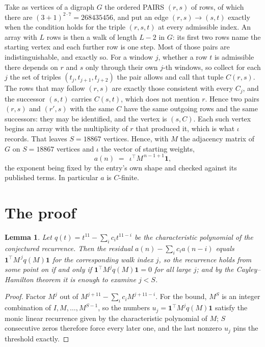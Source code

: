 \documentclass[11pt,a4paper]{article}
\theoremstyle{plain}
\newtheorem{lemma}[theorem]{Lemma}
\theoremstyle{definition}
\begin{document}
Take as vertices of a digraph $G$ the ordered PAIRS $(r,s)$ of rows, of which there are
$(3+1)^{2\cdot7}=268435456$, and put an edge $(r,s)\to(s,t)$ exactly when the condition
holds for the triple $(r,s,t)$ at every admissible index. An array with $L$ rows is then a
walk of length $L-2$ in $G$: its first two rows name the starting vertex and each further
row is one step. Most of those pairs are indistinguishable, and exactly so. For a window $j$, whether a row $t$ is admissible there depends on $r$ and $s$ only through their own $j$-th windows, so collect for each $j$ the set of triples $(t_j,t_{j+1},t_{j+2})$ the pair allows and call that tuple $C(r,s)$. The rows that may follow $(r,s)$ are exactly those consistent with every $C_j$, and the successor $(s,t)$ carries $C(s,t)$, which does not mention $r$. Hence two pairs $(r,s)$ and $(r',s)$ with the same $C$ have the same outgoing rows and the same successors: they may be identified, and the vertex is $(s,C)$. Each such vertex begins an array with the multiplicity of $r$ that produced it, which is what $\iota$ records. That leaves $S=18867$ vertices. Hence, with $M$ the adjacency matrix of $G$ on $S=18867$ vertices and
$\iota$ the vector of starting weights,
\[
a(n)\;=\;\,\iota^{\!\top}M^{\,n-1+1}\mathbf{1},
\]
the exponent being fixed by the entry's own shape and checked against its published terms.
In particular $a$ is $C$-finite.

\section{The proof}

\begin{lemma}\label{lem:crit}
Let $q(t)=t^{11}-\sum_i c_it^{11-i}$ be the characteristic polynomial of the
conjectured recurrence. Then the residual $a(n)-\sum_ic_ia(n-i)$ equals
$\mathbf{1}^{\!\top}M^{\,j}q(M)\mathbf{1}$ for the corresponding walk index
$j$, so the recurrence holds from some point on if and only if
$\mathbf{1}^{\!\top}M^{j}q(M)\mathbf{1}=0$ for all large $j$; and by the
Cayley--Hamilton theorem it is enough to examine $j<S$.
\end{lemma}

\begin{proof}
Factor $M^{j}$ out of $M^{j+11}-\sum_ic_iM^{j+11-i}$. For the bound, $M^{S}$
is an integer combination of $I,M,\dots,M^{S-1}$, so the numbers
$u_j=\mathbf{1}^{\!\top}M^{j}q(M)\mathbf{1}$ satisfy the monic linear recurrence given by
the characteristic polynomial of $M$; $S$ consecutive zeros therefore force every later one,
and the last nonzero $u_j$ pins the threshold exactly.
\end{proof}
\end{document}
